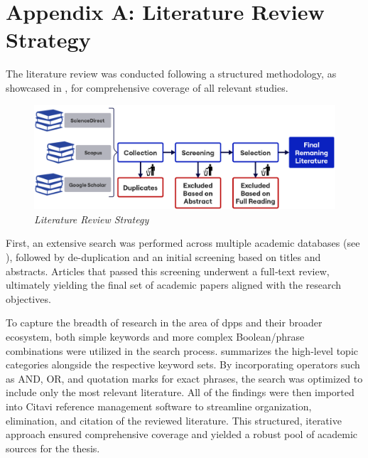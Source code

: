 \chapter{Appendix A: Literature Review Strategy}
\label{cha:anhang_A}

\renewcommand*{\thepage}{A-\arabic{page}} %

The literature review was conducted following a structured methodology, as showcased in , for comprehensive coverage of all relevant studies.

\begin{figure}[htbp] 
	\centering
	\includegraphics[width=\textwidth]{figures/literature_review.pdf}
    \caption{%
        \textit{Literature Review Strategy}
    }
	\label{fig:literature_review}
\end{figure}

First, an extensive search was performed across multiple academic databases (see ), followed by de-duplication and an initial screening based on titles and abstracts. Articles that passed this screening underwent a full‐text review, ultimately yielding the final set of academic papers aligned with the research objectives.

To capture the breadth of research in the area of \acrlong{dpp}s and their broader ecosystem, both simple keywords and more complex Boolean/phrase combinations were utilized in the search process.  summarizes the high-level topic categories alongside the respective keyword sets. By incorporating operators such as AND, OR, and quotation marks for exact phrases, the search was optimized to include only the most relevant literature. All of the findings were then imported into Citavi reference management software to streamline organization, elimination, and citation of the reviewed literature. This structured, iterative approach ensured comprehensive coverage and yielded a robust pool of academic sources for the thesis.

